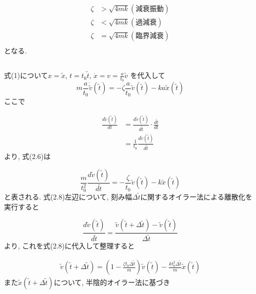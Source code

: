 \documentclass[a4paper,dvipdfmx]{jarticle}
\begin{document}
\begin{align*}
    \zeta & > \sqrt{4mk}　　 (減衰振動) \tag{2.3}\\
    \zeta & < \sqrt{4mk}　　 (過減衰) \tag{2.4}\\
    \zeta & = \sqrt{4mk}　　 (臨界減衰) \tag{2.5}\\
\end{align*}
となる.


\subsection{}

\noindent
式(1)について$x = \tilde{x}$, $t = t_0 \tilde{t}$, $\dot{x} = v = \frac{a}{t_0} \tilde{v}$
を代入して
\begin{equation}
    m \frac{a}{t_0} \dot{\tilde{v}}(\tilde{t}) = -\zeta \frac{a}{t_0} \tilde{v}(\tilde{t})
    -k a \tilde{x}(\tilde{t}) \tag{2.6}
\end{equation}
ここで

\begin{align*}
    \frac{d \tilde{v}(\tilde{t})}{dt} &= \frac{d \tilde{v}(\tilde{t})}{d \tilde{t}} \cdot \frac{d \tilde{t}}{dt} \\
    &= \frac{1}{t_0} \frac{d \tilde{v}(\tilde{t})}{d \tilde{t}} \tag{2.7}
\end{align*}
より, 式(2.6)は

\begin{equation}
    \frac{m}{t_0^2} \frac{d \tilde{v}(\tilde{t})}{d \tilde{t}} = - \frac{\zeta}{t_0} \tilde{v}(\tilde{t})
    -k \tilde{x}(\tilde{t}) \tag{2.8}
\end{equation}
と表される. 式(2.8)左辺について, 刻み幅$\Delta \tilde{t}$に関するオイラー法による離散化を実行すると

\begin{equation}
    \frac{d \tilde{v}(\tilde{t})}{d \tilde{t}} = \frac{\tilde{v}(\tilde{t} + \Delta \tilde{t}) - \tilde{v}(\tilde{t})}{\Delta \tilde{t}} 
    \tag {2.9}
\end{equation}
より, これを式(2.8)に代入して整理すると

\begin{align}
    \tilde{v}(\tilde{t} + \Delta \tilde{t}) = \left(1 - \frac{\zeta t_0 \Delta \tilde{t}}{m}\right) \tilde{v}(\tilde{t})
    - \frac{k t_0^2 \Delta \tilde{t}}{m} \tilde{x}(\tilde{t}) \tag{2.10}
\end{align}
また$\tilde{x}(\tilde{t} + \Delta \tilde{t})$について, 半陰的オイラー法に基づき
\end{document}
